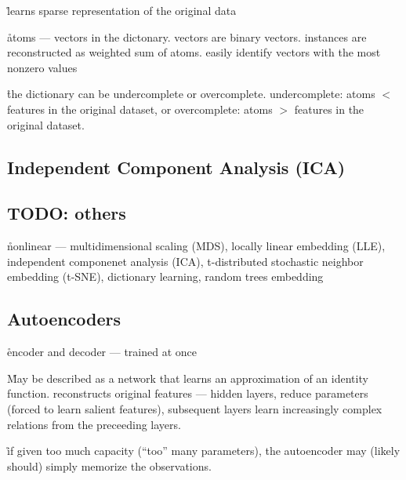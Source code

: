 \r{learns sparse representation of the original data}

\r{atoms --- vectors in the dictonary. vectors are binary vectors. instances are reconstructed as weighted sum of atoms. easily identify vectors with the most nonzero values}

\r{the dictionary can be undercomplete or overcomplete. undercomplete: atoms $<$ features in the original dataset, or overcomplete: atoms $>$ features in the original dataset.}



\subsection{Independent Component Analysis (ICA)}


\subsection{TODO: others}





\r{nonlinear --- multidimensional scaling (MDS), locally linear embedding (LLE), independent componenet analysis (ICA), t-distributed stochastic neighbor embedding (t-SNE), dictionary learning, random trees embedding}

\subsection{Autoencoders}


\r{encoder and decoder --- trained at once}

\r{May be described as a network that learns an approximation of an identity function. reconstructs original features --- hidden layers, reduce parameters (forced to learn salient features), subsequent layers learn increasingly complex relations from the preceeding layers.}

\r{if given too much capacity (``too'' many parameters), the autoencoder may (likely should) simply memorize the observations.}

